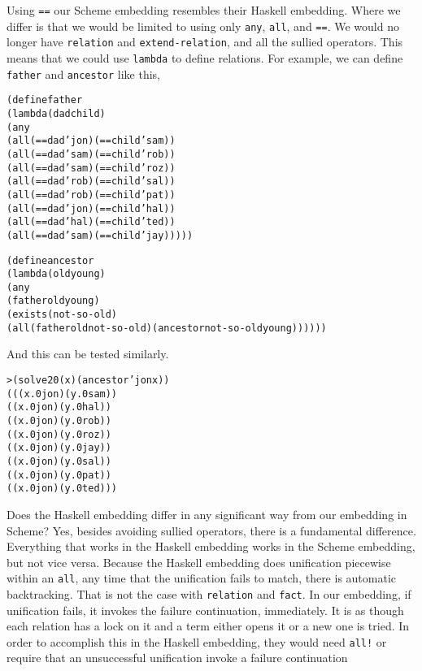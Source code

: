 Using \texttt{==} our Scheme embedding resembles their Haskell
embedding.  Where we differ is that we would be limited to using only
\texttt{any}, \texttt{all}, and \texttt{==}.  We would no longer have
\texttt{relation} and \texttt{extend-relation}, and all the sullied
operators.  This means that we could use \texttt{lambda} to define
relations.  For example, we can define \texttt{father} and
\texttt{ancestor} like this,

\begin{alltt}
(define father
  (lambda (dad child)
    (any
      (all (== dad 'jon) (== child 'sam))
      (all (== dad 'sam) (== child 'rob))
      (all (== dad 'sam) (== child 'roz))
      (all (== dad 'rob) (== child 'sal))
      (all (== dad 'rob) (== child 'pat))
      (all (== dad 'jon) (== child 'hal))
      (all (== dad 'hal) (== child 'ted))
      (all (== dad 'sam) (== child 'jay)))))
\end{alltt}

\begin{alltt}
(define ancestor
  (lambda (old young)
    (any
      (father old young)
      (exists (not-so-old)
        (all (father old not-so-old) (ancestor not-so-old young))))))
\end{alltt}
\noindent
And this can be tested similarly.
\begin{alltt}
> (solve 20 (x) (ancestor 'jon x))
(((x.0 jon) (y.0 sam))
 ((x.0 jon) (y.0 hal))
 ((x.0 jon) (y.0 rob))
 ((x.0 jon) (y.0 roz))
 ((x.0 jon) (y.0 jay))
 ((x.0 jon) (y.0 sal))
 ((x.0 jon) (y.0 pat))
 ((x.0 jon) (y.0 ted)))
\end{alltt}

Does the Haskell embedding differ in any significant way from our
embedding in Scheme?  Yes, besides avoiding sullied operators, there
is a fundamental difference.  Everything that works in the Haskell
embedding works in the Scheme embedding, but not vice versa.  Because
the Haskell embedding does unification piecewise within an
\texttt{all}, any time that the unification fails to match, there is
automatic backtracking.  That is not the case with \texttt{relation}
and \texttt{fact}.  In our embedding, if unification fails, it invokes
the failure continuation, immediately.  It is as though each relation
has a lock on it and a term either opens it or a new one is tried.  In
order to accomplish this in the Haskell embedding, they would need
\texttt{all!} or require that an unsuccessful unification invoke a
failure continuation

